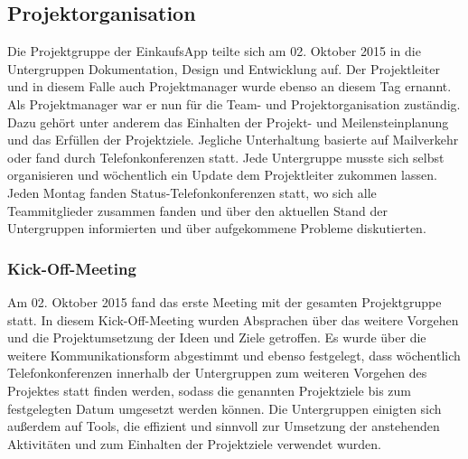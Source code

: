 \documentclass[12pt,a4paper]{article}
\begin{document}
\subsection{Projektorganisation}
Die Projektgruppe der EinkaufsApp teilte sich am 02. Oktober 2015 in die Untergruppen Dokumentation, Design und Entwicklung auf.
Der Projektleiter und in diesem Falle auch Projektmanager wurde ebenso an diesem Tag ernannt.
Als Projektmanager war er nun für die Team- und Projektorganisation zuständig. Dazu gehört unter anderem das Einhalten der Projekt- und Meilensteinplanung und das Erfüllen der Projektziele.
Jegliche Unterhaltung basierte auf Mailverkehr oder fand durch Telefonkonferenzen statt. Jede Untergruppe musste sich selbst organisieren und wöchentlich ein Update dem Projektleiter zukommen lassen. Jeden Montag fanden Status-Telefonkonferenzen statt, wo sich alle Teammitglieder zusammen fanden und über den aktuellen Stand der Untergruppen informierten und über aufgekommene Probleme diskutierten. 
\subsubsection{Kick-Off-Meeting}
Am 02. Oktober  2015 fand das erste Meeting mit der gesamten Projektgruppe statt. In diesem Kick-Off-Meeting wurden Absprachen über das weitere Vorgehen und die Projektumsetzung der Ideen und Ziele getroffen. Es wurde über die weitere Kommunikationsform abgestimmt und ebenso festgelegt, dass wöchentlich Telefonkonferenzen innerhalb der Untergruppen zum weiteren Vorgehen des Projektes statt finden werden, sodass die genannten Projektziele bis zum festgelegten Datum umgesetzt werden können. 
Die Untergruppen einigten sich außerdem auf Tools, die effizient und sinnvoll zur Umsetzung der anstehenden Aktivitäten und zum Einhalten der Projektziele verwendet wurden. 
\newpage
\end{document}
